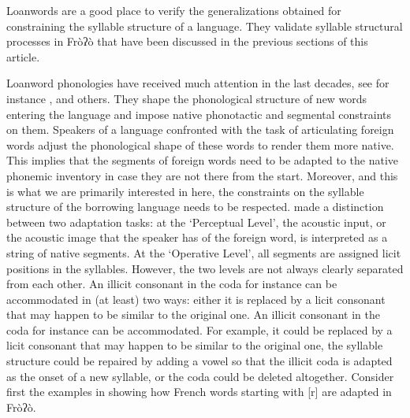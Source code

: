 \documentclass[output=paper]{langscibook}
\begin{document}
 Loanwords are a good place to verify the generalizations obtained for constraining the syllable structure of a language. They validate syllable structural processes in Fròʔò that have been discussed in the previous sections of this article.

Loanword phonologies have received much attention in the last decades, see for instance \citet{Ito1995},  \citet{Peperkamp2003} and others. They shape the phonological structure of new words entering the language and impose native phonotactic and segmental constraints on them. Speakers of a language confronted with the task of articulating foreign words adjust the phonological shape of these words to render them more native. This implies that the segments of foreign words need to be adapted to the native phonemic inventory in case they are not there from the start. Moreover, and this is what we are primarily interested in here, the constraints on the syllable structure of the borrowing language needs to be respected. \citet{Silverman1992} made a distinction between two adaptation tasks: at the ‘Perceptual Level’, the acoustic input, or the acoustic image that the speaker has of the foreign word, is interpreted as a string of native segments. At the ‘Operative Level’, all segments are assigned licit positions in the syllables. However, the two levels are not always clearly separated from each other. An illicit consonant in the coda for instance can be accommodated in (at least) two ways: either it is replaced by a licit consonant that may happen to be similar to the original one. An illicit consonant in the coda for instance can be accommodated. For example, it could be replaced by a licit consonant that may happen
to be similar to the original one, the syllable structure could be repaired by adding a vowel so that the illicit coda is adapted as the onset of a
new syllable, or the coda could be deleted altogether. Consider first the examples in  showing how French words starting with [r] are adapted in Fròʔò.
\end{document}

